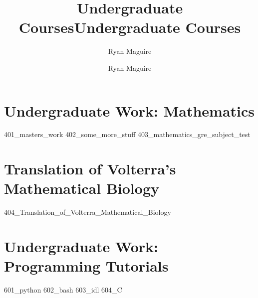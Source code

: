 \documentclass[crop=false,class=book,oneside]{standalone}
\title{Undergraduate Courses}
\author{Ryan Maguire}
\date{\vspace{-5ex}}
\begin{document}
    \newif\ifwork
    \ifstandalone
        \title{Undergraduate Courses}
        \author{Ryan Maguire}
        \date{\vspace{-5ex}}
        \maketitle
        \tableofcontents
        \listoffigures
        \listoftables
        \clearpage
    \fi
    \part{Undergraduate Work: Mathematics}
        {401_masters_work}
        {402_some_more_stuff}
        {403_mathematics_gre_subject_test}
    \part{Translation of Volterra's Mathematical Biology}
        {404_Translation_of_Volterra_Mathematical_Biology}
    \part{Undergraduate Work: Programming Tutorials}
        {601_python}
        {602_bash}
        {603_idl}
        {604_C}
\end{document}
